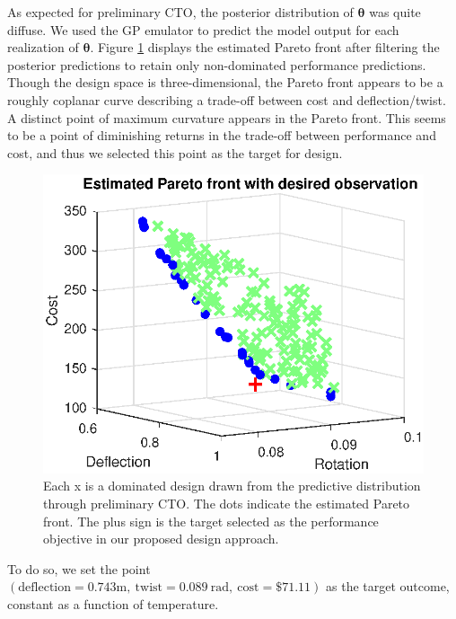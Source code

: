 \documentclass[12pt]{article}
\begin{document}
%
As expected for preliminary CTO, the posterior distribution of $\boldsymbol\theta$ was quite diffuse.
%
We used the GP emulator to predict the model output for each realization of $\boldsymbol \theta$.
%
Figure \ref{fig:elbow} displays the estimated Pareto front after filtering the posterior predictions to retain only non-dominated performance predictions.
%
Though the design space is three-dimensional, the Pareto front appears to be a roughly coplanar curve describing a trade-off between cost and deflection/twist.
%
A distinct point of maximum curvature appears in the Pareto front. 
%
This seems to be a point of diminishing returns in the trade-off between performance and cost, and thus we selected this point as the target for design.
%
\begin{figure}
\centering
\includegraphics[scale=0.8]{FIG_est_PF_with_des_obs.eps}
\caption{Each x is a dominated design drawn from the predictive distribution through preliminary CTO. The dots indicate the estimated Pareto front. The plus sign is the target selected as the performance objective in our proposed design approach.}
\label{fig:elbow}
\end{figure}
%
To do so, we set the point $(\mathrm{deflection}=0.743\mathrm m,\ 
\mathrm{twist}=0.089\ \mathrm{rad},\ 
\mathrm{cost}=\$71.11)$
 as the target outcome, constant as a function of temperature.
%
\end{document}
